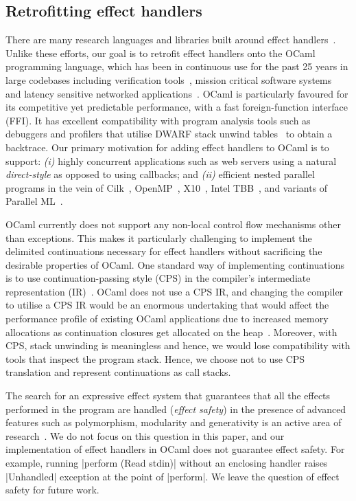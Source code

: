 \documentclass[sigplan,10pt,review,anonymous]{acmart}\settopmatter{printfolios=true,printccs=false,printacmref=false}
\begin{document}
\subsection{Retrofitting effect handlers}

There are many research languages and libraries built around effect
handlers~\cite{Leijen14,Hillerstrom20,Pyro,Frank,Eff}. Unlike these efforts, our
goal is to retrofit effect handlers onto the OCaml programming language, which
has been in continuous use for the past 25 years in large codebases including
verification tools~\cite{everest,Coq}, mission critical software
systems~\cite{astree} and latency sensitive networked
applications~\cite{Madhavapeddy13}. OCaml is particularly favoured for its
competitive yet predictable performance, with a fast foreign-function interface
(FFI). It has excellent compatibility with program analysis tools such as debuggers
and profilers that utilise DWARF stack unwind tables~\cite{DWARF} to obtain a
backtrace. Our primary motivation for adding effect handlers to OCaml is to
support: {\em (i)} highly concurrent applications such as web servers using a
natural \emph{direct-style} as opposed to using callbacks; and {\em (ii)} efficient
nested parallel programs in the vein of Cilk~\cite{Cilk}, OpenMP~\cite{OpenMP},
X10~\cite{Charles05}, Intel TBB~\cite{IntelTBB}, and variants of Parallel
ML~\cite{MaPLe, Fluet10, Sivaramakrishnan14}.

OCaml currently does not support any non-local control flow mechanisms other
than exceptions. This makes it particularly challenging to implement the
delimited continuations necessary for effect handlers without sacrificing the
desirable properties of OCaml. One standard way of implementing continuations is
to use continuation-passing style (CPS) in the compiler's intermediate
representation (IR)~\cite{Leijen14}.
OCaml does not use a CPS IR, and changing the compiler to utilise a CPS IR
would be an enormous undertaking that would affect the
performance profile of existing OCaml applications due to increased memory allocations as
continuation closures get allocated on the heap~\cite{Farvardin20}. Moreover,
with CPS, stack unwinding is meaningless and hence, we would lose compatibility
with tools that inspect the program stack. Hence, we choose not to use CPS
translation and represent continuations as call stacks.

The search for an expressive effect system that guarantees that all the effects
performed in the program are handled (\emph{effect safety}) in the presence of
advanced features such as polymorphism, modularity and generativity is an
active area of research~\cite{Leijen14, Biernacki19, Biernacki20,
Hillerstrom20}. We do not focus on this question in this paper, and our
implementation of effect handlers in OCaml does not guarantee effect safety.
For example, running |perform (Read stdin)| without an enclosing handler raises
|Unhandled| exception at the point of |perform|. We leave the question of
effect safety for future work.
\end{document}
